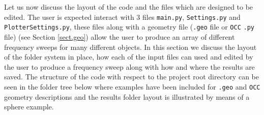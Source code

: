 Let us now discuss the layout of the code and the files which are designed to be edited. The user is expected interact with 3 files \texttt{main.py}, \texttt{Settings.py} and \texttt{PlotterSettings.py}, these files along with a geometry file (\texttt{.geo} file or \texttt{OCC} \texttt{.py} file) (see Section \ref{sect.geo}) allow the user to produce an array of different frequency sweeps for many different objects. In this section we discuss the layout of the folder system in place, how each of the input files can used and edited by the user to produce a frequency sweep along with how and where the results are saved. The structure of the code with respect to the project root directory can be seen in the folder tree below where examples have been included for \texttt{.geo} and \texttt{OCC} geometry descriptions and the results folder layout is illustrated by means of a sphere example. 

